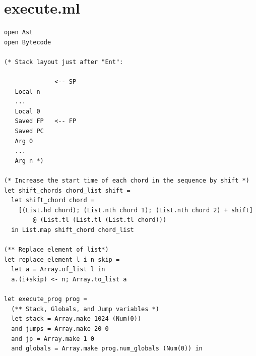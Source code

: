 \documentclass[12pt,A4]{book}
\begin{document}
\section{execute.ml}
\begin{verbatim}
open Ast
open Bytecode

(* Stack layout just after "Ent":

              <-- SP
   Local n
   ...
   Local 0
   Saved FP   <-- FP
   Saved PC
   Arg 0
   ...
   Arg n *)
 
(* Increase the start time of each chord in the sequence by shift *)   
let shift_chords chord_list shift =
  let shift_chord chord =
    [(List.hd chord); (List.nth chord 1); (List.nth chord 2) + shift] 
        @ (List.tl (List.tl (List.tl chord)))
  in List.map shift_chord chord_list
  
(** Replace element of list*)
let replace_element l i n skip = 
  let a = Array.of_list l in
  a.(i+skip) <- n; Array.to_list a

let execute_prog prog =
  (** Stack, Globals, and Jump variables *)
  let stack = Array.make 1024 (Num(0))
  and jumps = Array.make 20 0 
  and jp = Array.make 1 0
  and globals = Array.make prog.num_globals (Num(0)) in


\end{verbatim}
\end{document}
